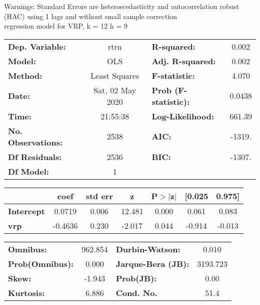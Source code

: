 Warnings: \newline
 [1] Standard Errors are heteroscedasticity and autocorrelation robust (HAC) using 1 lags and without small sample correction\\ 

regression model for VRP, k = 12 h = 9\begin{center}
\begin{tabular}{lclc}
\toprule
\textbf{Dep. Variable:}    &       rtrn       & \textbf{  R-squared:         } &     0.002   \\
\textbf{Model:}            &       OLS        & \textbf{  Adj. R-squared:    } &     0.002   \\
\textbf{Method:}           &  Least Squares   & \textbf{  F-statistic:       } &     4.070   \\
\textbf{Date:}             & Sat, 02 May 2020 & \textbf{  Prob (F-statistic):} &   0.0438    \\
\textbf{Time:}             &     21:55:38     & \textbf{  Log-Likelihood:    } &    661.39   \\
\textbf{No. Observations:} &        2538      & \textbf{  AIC:               } &    -1319.   \\
\textbf{Df Residuals:}     &        2536      & \textbf{  BIC:               } &    -1307.   \\
\textbf{Df Model:}         &           1      & \textbf{                     } &             \\
\bottomrule
\end{tabular}
\begin{tabular}{lcccccc}
                   & \textbf{coef} & \textbf{std err} & \textbf{z} & \textbf{P$> |$z$|$} & \textbf{[0.025} & \textbf{0.975]}  \\
\midrule
\textbf{Intercept} &       0.0719  &        0.006     &    12.481  &         0.000        &        0.061    &        0.083     \\
\textbf{vrp}       &      -0.4636  &        0.230     &    -2.017  &         0.044        &       -0.914    &       -0.013     \\
\bottomrule
\end{tabular}
\begin{tabular}{lclc}
\textbf{Omnibus:}       & 962.854 & \textbf{  Durbin-Watson:     } &    0.010  \\
\textbf{Prob(Omnibus):} &   0.000 & \textbf{  Jarque-Bera (JB):  } & 3193.723  \\
\textbf{Skew:}          &  -1.943 & \textbf{  Prob(JB):          } &     0.00  \\
\textbf{Kurtosis:}      &   6.886 & \textbf{  Cond. No.          } &     51.4  \\
\bottomrule
\end{tabular}
\end{center}

